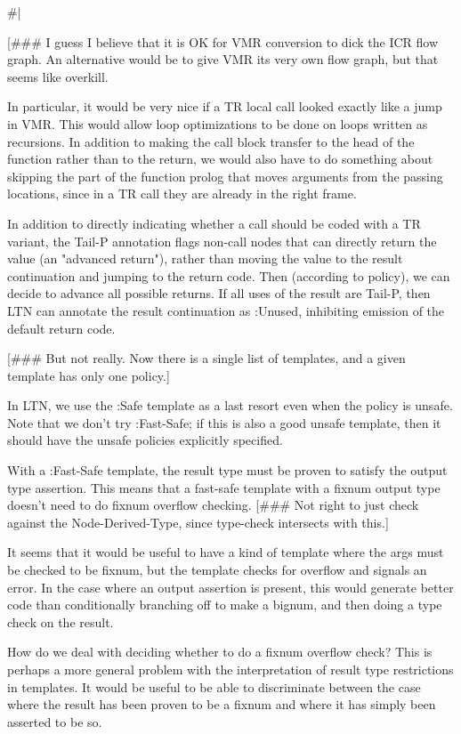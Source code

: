 \#|

[\#\#\# I guess I believe that it is OK for VMR conversion to dick the ICR flow
graph.  An alternative would be to give VMR its very own flow graph, but that
seems like overkill.

In particular, it would be very nice if a TR local call looked exactly like a
jump in VMR.  This would allow loop optimizations to be done on loops written
as recursions.  In addition to making the call block transfer to the head of
the function rather than to the return, we would also have to do something
about skipping the part of the function prolog that moves arguments from the
passing locations, since in a TR call they are already in the right frame.


In addition to directly indicating whether a call should be coded with a TR
variant, the Tail-P annotation flags non-call nodes that can directly return
the value (an "advanced return"), rather than moving the value to the result
continuation and jumping to the return code.  Then (according to policy), we
can decide to advance all possible returns.  If all uses of the result are
Tail-P, then LTN can annotate the result continuation as :Unused, inhibiting
emission of the default return code.

[\#\#\# But not really.  Now there is a single list of templates, and a given
template has only one policy.]

In LTN, we use the :Safe template as a last resort even when the policy is
unsafe.  Note that we don't try :Fast-Safe; if this is also a good unsafe
template, then it should have the unsafe policies explicitly specified.

With a :Fast-Safe template, the result type must be proven to satisfy the
output type assertion.  This means that a fast-safe template with a fixnum
output type doesn't need to do fixnum overflow checking.  [\#\#\# Not right to
just check against the Node-Derived-Type, since type-check intersects with
this.]

It seems that it would be useful to have a kind of template where the args must
be checked to be fixnum, but the template checks for overflow and signals an
error.  In the case where an output assertion is present, this would generate
better code than conditionally branching off to make a bignum, and then doing a
type check on the result.

    How do we deal with deciding whether to do a fixnum overflow check?  This
    is perhaps a more general problem with the interpretation of result type
    restrictions in templates.  It would be useful to be able to discriminate
    between the case where the result has been proven to be a fixnum and where
    it has simply been asserted to be so.


